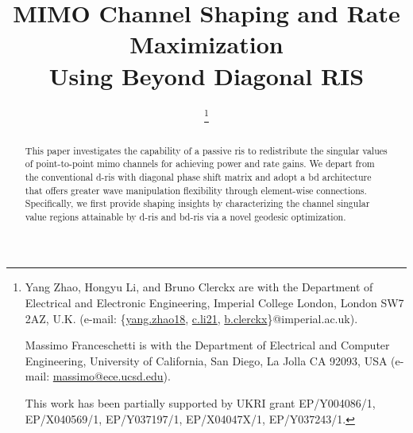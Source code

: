 \documentclass[journal]{IEEEtran}
\title{MIMO Channel Shaping and Rate Maximization\\Using Beyond Diagonal RIS}
\author{
	\IEEEauthorblockN{
		Yang Zhao, \IEEEmembership{Member, IEEE,}
		Hongyu Li, \IEEEmembership{Graduate Student Member, IEEE,}\\
		Massimo Franceschetti, \IEEEmembership{Fellow, IEEE,}
		and Bruno Clerckx, \IEEEmembership{Fellow, IEEE}
	}
	\thanks{
		Yang Zhao, Hongyu Li, and Bruno Clerckx are with the Department of Electrical and Electronic Engineering, Imperial College London, London SW7 2AZ, U.K. (e-mail: \{\href{mailto:yang.zhao18@imperial.ac.uk}{yang.zhao18}, \href{mailto:c.li21@imperial.ac.uk}{c.li21}, \href{mailto:b.clerckx@imperial.ac.uk}{b.clerckx}\}@imperial.ac.uk).

		Massimo Franceschetti is with the Department of Electrical and Computer Engineering, University of California, San Diego, La Jolla CA 92093, USA (e-mail: \href{mailto:massimo@ece.ucsd.edu}{massimo@ece.ucsd.edu}).

		This work has been partially supported by UKRI grant EP/Y004086/1, EP/X040569/1, EP/Y037197/1, EP/X04047X/1, EP/Y037243/1.
	}
}
\begin{document}
\maketitle

\begin{abstract}
	This paper investigates the capability of a passive \gls{ris} to redistribute the singular values of point-to-point \gls{mimo} channels for achieving power and rate gains.
	We depart from the conventional \gls{d}-\gls{ris} with diagonal phase shift matrix
	and adopt a \gls{bd} architecture that offers greater wave manipulation flexibility through element-wise connections.
	Specifically, we first
	provide shaping insights by characterizing
	the channel singular value regions attainable by \gls{d}-\gls{ris} and \gls{bd}-\gls{ris} via a novel geodesic optimization.

\end{abstract}
\end{document}
